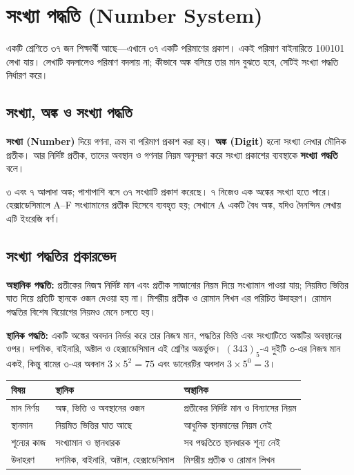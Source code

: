 \section{সংখ্যা পদ্ধতি (\textenglish{Number System})}
একটি শ্রেণিতে ৩৭ জন শিক্ষার্থী আছে—এখানে ৩৭ একটি পরিমাণের প্রকাশ। একই পরিমাণ বাইনারিতে 100101 লেখা যায়। লেখাটি বদলালেও পরিমাণ বদলায় না; কীভাবে অঙ্ক বসিয়ে তার মান বুঝতে হবে, সেটিই সংখ্যা পদ্ধতি নির্ধারণ করে।

\subsection{সংখ্যা, অঙ্ক ও সংখ্যা পদ্ধতি}
\textbf{সংখ্যা (Number)} দিয়ে গণনা, ক্রম বা পরিমাণ প্রকাশ করা হয়। \textbf{অঙ্ক (Digit)} হলো সংখ্যা লেখার মৌলিক প্রতীক। আর নির্দিষ্ট প্রতীক, তাদের অবস্থান ও গণনার নিয়ম অনুসরণ করে সংখ্যা প্রকাশের ব্যবস্থাকে \textbf{সংখ্যা পদ্ধতি} বলে।

৩ এবং ৭ আলাদা অঙ্ক; পাশাপাশি বসে ৩৭ সংখ্যাটি প্রকাশ করেছে। ৭ নিজেও এক অঙ্কের সংখ্যা হতে পারে। হেক্সাডেসিমালে A–F সংখ্যামানের প্রতীক হিসেবে ব্যবহৃত হয়; সেখানে A একটি বৈধ অঙ্ক, যদিও দৈনন্দিন লেখায় এটি ইংরেজি বর্ণ।

\subsection{সংখ্যা পদ্ধতির প্রকারভেদ}
\textbf{অস্থানিক পদ্ধতি:} প্রতীকের নিজস্ব নির্দিষ্ট মান এবং প্রতীক সাজানোর নিয়ম দিয়ে সংখ্যামান পাওয়া যায়; নিয়মিত ভিত্তির ঘাত দিয়ে প্রতিটি স্থানকে ওজন দেওয়া হয় না। মিশরীয় প্রতীক ও রোমান লিখন এর পরিচিত উদাহরণ। রোমান পদ্ধতির বিশেষ বিয়োগের নিয়মও মেনে চলতে হয়।

\textbf{স্থানিক পদ্ধতি:} একটি অঙ্কের অবদান নির্ভর করে তার নিজস্ব মান, পদ্ধতির ভিত্তি এবং সংখ্যাটিতে অঙ্কটির অবস্থানের ওপর। দশমিক, বাইনারি, অক্টাল ও হেক্সাডেসিমাল এই শ্রেণির অন্তর্ভুক্ত। $(343)_5$-এ দুইটি ৩-এর নিজস্ব মান একই, কিন্তু বামের ৩-এর অবদান $3\times5^2=75$ এবং ডানেরটির অবদান $3\times5^0=3$।
\begin{center}\begin{tabularx}{\linewidth}{|L{.2\linewidth}|Y|Y|}\hline
{}বিষয়&স্থানিক&অস্থানিক\\\hline
মান নির্ণয়&অঙ্ক, ভিত্তি ও অবস্থানের ওজন&প্রতীকের নির্দিষ্ট মান ও বিন্যাসের নিয়ম\\\hline
স্থানমান&নিয়মিত ভিত্তির ঘাত আছে&আধুনিক স্থানমানের নিয়ম নেই\\\hline
শূন্যের কাজ&সংখ্যামান ও স্থানধারক&সব পদ্ধতিতে স্থানধারক শূন্য নেই\\\hline
উদাহরণ&দশমিক, বাইনারি, অক্টাল, হেক্সাডেসিমাল&মিশরীয় প্রতীক ও রোমান লিখন\\\hline
\end{tabularx}\end{center}

